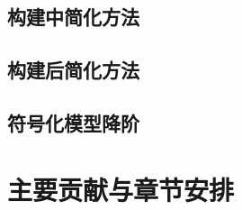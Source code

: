 \subsection{构建中简化方法}
\label{subsec:intro:simp:SDG}
\parencite{Fern-SDG-1994}
\subsection{构建后简化方法}
\label{subsec:intro:simp:SAG}
\parencite{Zivkovic-TopoSimp-1995,Sheldon-DDDSimp-1999}

\subsection{符号化模型降阶}
\label{subsec:intro:symbolic:smor}
\parencite{GShi-SMOR-2006}

\section{主要贡献与章节安排}

\label{sec:intro:org}
